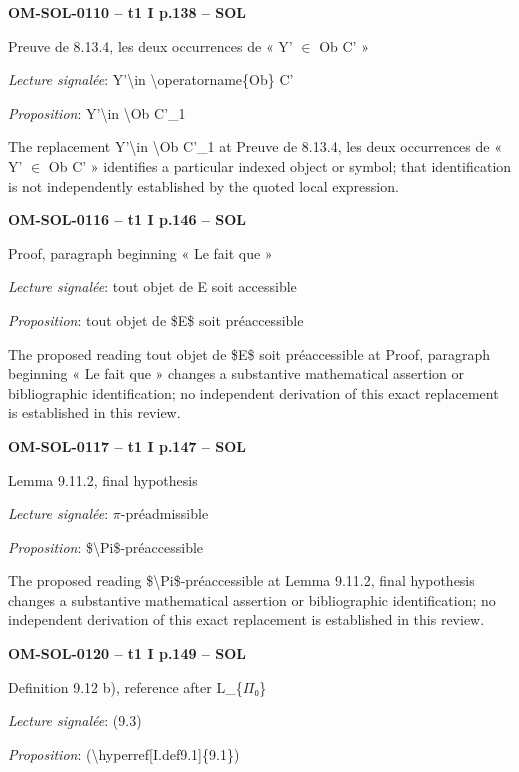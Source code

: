 \par\noindent\textbf{OM-SOL-0110 -- t1 I p.138 -- SOL}\par
Preuve de 8.13.4, les deux occurrences de « Y' \ensuremath{\in} Ob C' »\par
\emph{Lecture signalée}: Y'\textbackslash{}in \textbackslash{}operatorname\{Ob\} C'\par
\emph{Proposition}: Y'\textbackslash{}in \textbackslash{}Ob C'\_1\par
The replacement Y'\textbackslash{}in \textbackslash{}Ob C'\_1 at Preuve de 8.13.4, les deux occurrences de « Y' \ensuremath{\in} Ob C' » identifies a particular indexed object or symbol; that identification is not independently established by the quoted local expression.\par
\par\noindent\textbf{OM-SOL-0116 -- t1 I p.146 -- SOL}\par
Proof, paragraph beginning « Le fait que »\par
\emph{Lecture signalée}: tout objet de E soit accessible\par
\emph{Proposition}: tout objet de \$E\$ soit préaccessible\par
The proposed reading tout objet de \$E\$ soit préaccessible at Proof, paragraph beginning « Le fait que » changes a substantive mathematical assertion or bibliographic identification; no independent derivation of this exact replacement is established in this review.\par
\par\noindent\textbf{OM-SOL-0117 -- t1 I p.147 -- SOL}\par
Lemma 9.11.2, final hypothesis\par
\emph{Lecture signalée}: \ensuremath{\pi}-préadmissible\par
\emph{Proposition}: \$\textbackslash{}Pi\$-préaccessible\par
The proposed reading \$\textbackslash{}Pi\$-préaccessible at Lemma 9.11.2, final hypothesis changes a substantive mathematical assertion or bibliographic identification; no independent derivation of this exact replacement is established in this review.\par
\par\noindent\textbf{OM-SOL-0120 -- t1 I p.149 -- SOL}\par
Definition 9.12 b), reference after L\_\{\ensuremath{\Pi}₀\}\par
\emph{Lecture signalée}: (9.3)\par
\emph{Proposition}: (\textbackslash{}hyperref[I.def9.1]\{9.1\})\par
